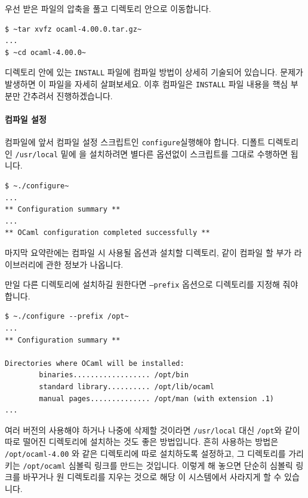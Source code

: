 \begin{center}
\end{center}

우선 받은 파일의 압축을 풀고 디렉토리 안으로 이동합니다.

\begin{lstlisting}
$ ~tar xvfz ocaml-4.00.0.tar.gz~
...
$ ~cd ocaml-4.00.0~
\end{lstlisting}

디렉토리 안에 있는 \texttt{INSTALL} 파일에 컴파일 방법이 상세히 기술되어
있습니다. 문제가 발생하면 이 파일을 자세히 살펴보세요. 이후 컴파일은
\texttt{INSTALL} 파일 내용을 핵심 부분만 간추려서 진행하겠습니다.

\paragraph{컴파일 설정} 컴파일에 앞서 컴파일 설정 스크립트인
\texttt{configure}\를 실행해야 합니다. 디폴트 디렉토리인 \texttt{/usr/local}
밑에 \OCAML{}을 설치하려면 별다른 옵션없이 스크립트를 그대로 수행하면 됩니다.

\begin{lstlisting}
$ ~./configure~
...
** Configuration summary **
...
** OCaml configuration completed successfully **
\end{lstlisting}

마지막 요약란에는 컴파일 시 사용될 옵션과 설치할 디렉토리, 같이 컴파일 할 부가
라이브러리에 관한 정보가 나옵니다.

만일 다른 디렉토리에 설치하길 원한다면 \texttt{--prefix} 옵션으로 디렉토리를
지정해 줘야 합니다.

\begin{lstlisting}
$ ~./configure --prefix /opt~
...
** Configuration summary **

Directories where OCaml will be installed:
        binaries.................. /opt/bin
        standard library.......... /opt/lib/ocaml
        manual pages.............. /opt/man (with extension .1)
...
\end{lstlisting}

여러 버전의 \OCAML{}\을 사용해야 하거나 나중에 \OCAML{}\을 삭제할 것이라면
\texttt{/usr/local} 대신 \texttt{/opt}와 같이 따로 떨어진 디렉토리에 설치하는
것도 좋은 방법입니다. 흔히 사용하는 방법은 \texttt{/opt/ocaml-4.00} 와 같은
디렉토리에 따로 설치하도록 설정하고, 그 디렉토리를 가리키는
\texttt{/opt/ocaml} 심볼릭 링크를 만드는 것입니다. 이렇게 해 놓으면 단순히
심볼릭 링크를 바꾸거나 원 디렉토리를 지우는 것으로 해당 \OCAML{}이 시스템에서
사라지게 할 수 있습니다.


